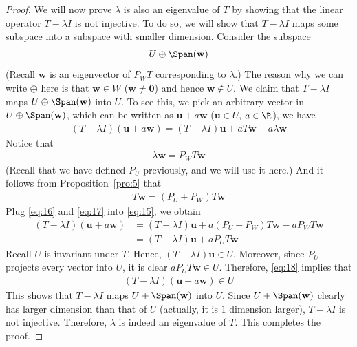 \documentclass[thmcnt=section, color=blue, 12pt]{my-elegantbook}
\begin{document}
\begin{proof}
    \par We will now prove $\lambda$ is also an eigenvalue of $T$ by showing that the linear operator $T - \lambda I$ is not injective. To do so, we will show that $T - \lambda I$ maps some subspace into a subspace with smaller dimension. Consider the subspace
    \begin{align*}
        U \oplus \Span(\mathbf{w})
    \end{align*}
    (Recall $\mathbf{w}$ is an eigenvector of $P_W T$ corresponding to $\lambda$.) The reason why we can write $\oplus$ here is that $\mathbf{w} \in W$ ($\mathbf{w} \neq \mathbf{0}$) and hence $\mathbf{w} \notin U$. We claim that $T - \lambda I$ maps $U \oplus \Span(\mathbf{w})$ into $U$. To see this, we pick an arbitrary vector in $U \oplus \Span(\mathbf{w})$, which can be written as $\mathbf{u} + a \mathbf{w}$ ($\mathbf{u} \in U$, $a \in \R$), we have 
    \begin{align}
        (T - \lambda I) (\mathbf{u} + a \mathbf{w})
        = (T - \lambda I) \mathbf{u} 
        + a T \mathbf{w}
        - a \lambda \mathbf{w}
        \label{eq:15}
    \end{align}
    Notice that 
    \begin{align}
        \lambda \mathbf{w} = P_W T \mathbf{w}
        \label{eq:16}
    \end{align}
    (Recall that we have defined $P_U$ previously, and we will use it here.) And it follows from Proposition~\ref{pro:5} that 
    \begin{align}
        T \mathbf{w} = (P_U + P_W) T \mathbf{w}
        \label{eq:17}
    \end{align}
    Plug \eqref{eq:16} and \eqref{eq:17} into \eqref{eq:15}, we obtain 
    \begin{align}
        (T - \lambda I) (\mathbf{u} + a \mathbf{w})
        &= (T - \lambda I) \mathbf{u}
        + a (P_U + P_W) T \mathbf{w}
        - a P_W T \mathbf{w} \nonumber \\ 
        &= (T - \lambda I) \mathbf{u}
        + a P_U T \mathbf{w}
        \label{eq:18}
    \end{align}
    Recall $U$ is invariant under $T$. Hence, $(T - \lambda I) \mathbf{u} \in U$. Moreover, since $P_U$ projects every vector into $U$, it is clear $a P_U T \mathbf{w} \in U$. Therefore, \eqref{eq:18} implies that 
    \begin{align*}
        (T - \lambda I) (\mathbf{u} + a \mathbf{w}) \in U
    \end{align*}
    This shows that $T - \lambda I$ maps $U + \Span(\mathbf{w})$ into $U$. Since $U + \Span(\mathbf{w})$ clearly has larger dimension than that of $U$ (actually, it is $1$ dimension larger), $T - \lambda I$ is not injective. Therefore, $\lambda$ is indeed an eigenvalue of $T$. This completes the proof.
\end{proof}
\end{document}
